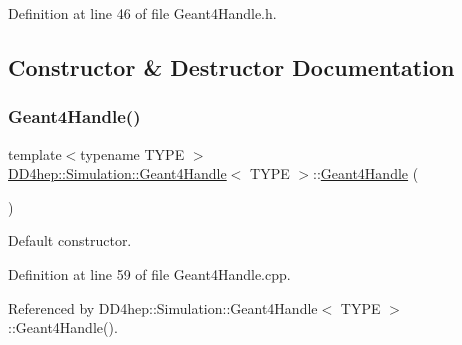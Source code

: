 Definition at line 46 of file Geant4\+Handle.\+h.



\subsection{Constructor \& Destructor Documentation}
\hypertarget{class_d_d4hep_1_1_simulation_1_1_geant4_handle_a0c81dba8f012c42cf56aa9de145ceba7}{}\label{class_d_d4hep_1_1_simulation_1_1_geant4_handle_a0c81dba8f012c42cf56aa9de145ceba7} 
\subsubsection{\texorpdfstring{Geant4\+Handle()}{Geant4Handle()}\hspace{0.1cm}{\footnotesize\ttfamily [1/20]}}
{\footnotesize\ttfamily template$<$typename T\+Y\+PE $>$ \\
\hyperlink{class_d_d4hep_1_1_simulation_1_1_geant4_handle}{D\+D4hep\+::\+Simulation\+::\+Geant4\+Handle}$<$ T\+Y\+PE $>$\+::\hyperlink{class_d_d4hep_1_1_simulation_1_1_geant4_handle}{Geant4\+Handle} (\begin{DoxyParamCaption}{ }\end{DoxyParamCaption})\hspace{0.3cm}{\ttfamily [explicit]}}



Default constructor. 



Definition at line 59 of file Geant4\+Handle.\+cpp.



Referenced by D\+D4hep\+::\+Simulation\+::\+Geant4\+Handle$<$ T\+Y\+P\+E $>$\+::\+Geant4\+Handle().

\hypertarget{class_d_d4hep_1_1_simulation_1_1_geant4_handle_a82201301931f3fc74f9ad0c4fe6b9071}{}\label{class_d_d4hep_1_1_simulation_1_1_geant4_handle_a82201301931f3fc74f9ad0c4fe6b9071} 
